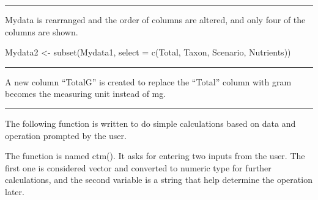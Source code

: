 \documentclass[
]{article}
\newenvironment{Shaded}{\begin{snugshade}}{\end{snugshade}}
\newcommand{\AttributeTok}[1]{\textcolor[rgb]{0.77,0.63,0.00}{#1}}
\newcommand{\DecValTok}[1]{\textcolor[rgb]{0.00,0.00,0.81}{#1}}
\newcommand{\FunctionTok}[1]{\textcolor[rgb]{0.00,0.00,0.00}{#1}}
\newcommand{\NormalTok}[1]{#1}
\newcommand{\OtherTok}[1]{\textcolor[rgb]{0.56,0.35,0.01}{#1}}
\newcommand{\SpecialCharTok}[1]{\textcolor[rgb]{0.00,0.00,0.00}{#1}}
\begin{document}
\begin{center}\rule{0.5\linewidth}{0.5pt}\end{center}

Mydata is rearranged and the order of columns are altered, and only four
of the columns are shown.

\begin{Shaded}
\begin{Highlighting}[]
\NormalTok{Mydata2 }\OtherTok{\textless{}{-}} \FunctionTok{subset}\NormalTok{(Mydata1, }\AttributeTok{select =} \FunctionTok{c}\NormalTok{(Total, Taxon, Scenario, Nutrients))}
\end{Highlighting}
\end{Shaded}

\begin{center}\rule{0.5\linewidth}{0.5pt}\end{center}

A new column ``TotalG'' is created to replace the ``Total'' column with
gram becomes the measuring unit instead of mg.

\begin{Shaded}
\end{Shaded}

\begin{center}\rule{0.5\linewidth}{0.5pt}\end{center}

The following function is written to do simple calculations based on
data and operation prompted by the user.

The function is named ctm(). It asks for entering two inputs from the
user. The first one is considered vector and converted to numeric type
for further calculations, and the second variable is a string that help
determine the operation later.
\end{document}
